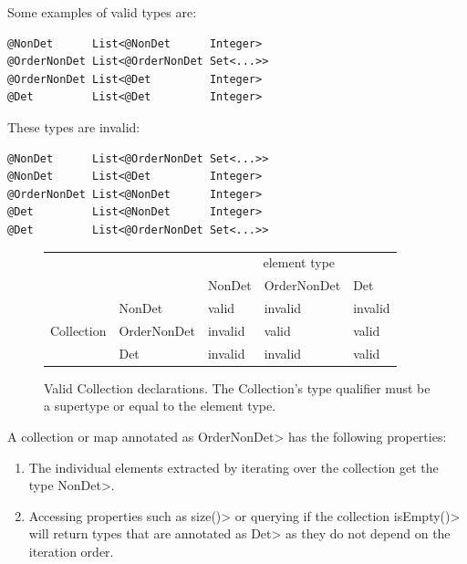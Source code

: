 \smallskip
\noindent
\begin{minipage}{.48\textwidth}
Some examples of valid types are:
\begin{smaller}
\begin{Verbatim}
@NonDet      List<@NonDet      Integer>
@OrderNonDet List<@OrderNonDet Set<...>>
@OrderNonDet List<@Det         Integer>
@Det         List<@Det         Integer>

\end{Verbatim}
\end{smaller}
\end{minipage}
\hfill
\begin{minipage}{.46\textwidth}
These types are invalid:
\begin{smaller}
\begin{Verbatim}
@NonDet      List<@OrderNonDet Set<...>>
@NonDet      List<@Det         Integer>
@OrderNonDet List<@NonDet      Integer>
@Det         List<@NonDet      Integer>
@Det         List<@OrderNonDet Set<...>>
\end{Verbatim}
\end{smaller}
\end{minipage}
\smallskip

\begin{figure}
    \centering
    \begin{tabular}{|l|l|l|l|l|}
        \cline{3-5}
        \multicolumn{2}{c|}{~}  &  \multicolumn{3}{c|}{element type} \\ \cline{3-5}
        \multicolumn{2}{c|}{~}  & NonDet     & OrderNonDet & Det \\ \hline
        & NonDet      &   valid    &  invalid    & invalid  \\ \cline{2-5}
        Collection    & OrderNonDet &   invalid  &  valid      & valid  \\ \cline{2-5}
        & Det         &   invalid  &  invalid    & valid      \\ \hline
    \end{tabular}
    \caption{Valid Collection declarations.  The Collection's type qualifier
        must be a supertype or equal to the element type.}
    \label{fig-determinism-collections}
\end{figure}

A collection or map annotated as \<OrderNonDet> has the following properties:
\begin{enumerate}
    \item The individual elements extracted by iterating over the collection get the type \<NonDet>.
    \item Accessing properties such as \<size()> or querying if the collection \<isEmpty()> will return types
    that are annotated as \<Det> as they do not depend on the iteration order. 
\end{enumerate}



